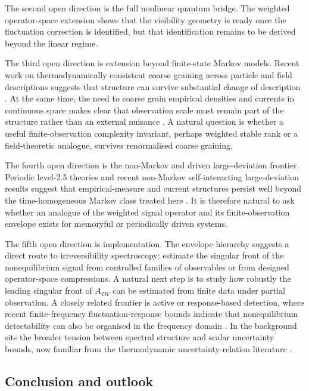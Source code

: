 \documentclass[11pt,a4paper]{article}
\numberwithin{equation}{section}
\theoremstyle{thmcompact}
\theoremstyle{remark}
\begin{document}
The second open direction is the full nonlinear quantum bridge. The weighted operator-space extension shows that the visibility geometry is ready once the fluctuation correction is identified, but that identification remains to be derived beyond the linear regime.

The third open direction is extension beyond finite-state Markov models. Recent work on thermodynamically consistent coarse graining across particle and field descriptions suggests that structure can survive substantial change of description \cite{MohiteRieger2026}. At the same time, the need to coarse grain empirical densities and currents in continuous space makes clear that observation scale must remain part of the structure rather than an external nuisance \cite{DieballGodec2022,DieballGodec2025,FalascoEsposito2025}. A natural question is whether a useful finite-observation complexity invariant, perhaps weighted stable rank or a field-theoretic analogue, survives renormalised coarse graining.

The fourth open direction is the non-Markov and driven large-deviation frontier. Periodic level-2.5 theories and recent non-Markov self-interacting large-deviation results suggest that empirical-measure and current structures persist well beyond the time-homogeneous Markov class treated here \cite{BertiniChetriteFaggionatoGabrielli2018,CoghiBudhirajaGarrahan2026}. It is therefore natural to ask whether an analogue of the weighted signal operator and its finite-observation envelope exists for memoryful or periodically driven systems.

The fifth open direction is implementation. The envelope hierarchy suggests a direct route to irreversibility spectroscopy: estimate the singular front of the nonequilibrium signal from controlled families of observables or from designed operator-space compressions. A natural next step is to study how robustly the leading singular front of \(A_{DV}\) can be estimated from finite data under partial observation. A closely related frontier is active or response-based detection, where recent finite-frequency fluctuation-response bounds indicate that nonequilibrium detectability can also be organised in the frequency domain \cite{ZhengLu2026}. In the background sits the broader tension between spectral structure and scalar uncertainty bounds, now familiar from the thermodynamic uncertainty-relation literature \cite{BaratoSeifert2015,HorowitzGingrich2020}.

\subsection{Conclusion and outlook}
\end{document}
